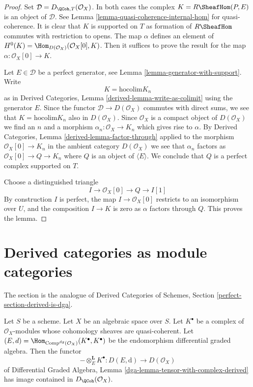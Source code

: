 \begin{proof}
Set $\mathcal{D} = D_{\QCoh, T}(\mathcal{O}_X)$. In both cases the complex
$K = R\SheafHom(P, E)$ is an object of $\mathcal{D}$. See
Lemma \ref{lemma-quasi-coherence-internal-hom} for quasi-coherence.
It is clear that $K$ is supported on $T$ as formation of $R\SheafHom$
commutes with restriction to opens.
The map $\alpha$ defines an element of
$H^0(K) = \Hom_{D(\mathcal{O}_X)}(\mathcal{O}_X[0], K)$.
Then it suffices to prove the result for the map
$\alpha : \mathcal{O}_X[0] \to K$.

\medskip\noindent
Let $E \in \mathcal{D}$ be a perfect generator, see
Lemma \ref{lemma-generator-with-support}. Write
$$
K = \text{hocolim} K_n
$$
as in Derived Categories, Lemma \ref{derived-lemma-write-as-colimit}
using the generator $E$. Since the functor $\mathcal{D} \to D(\mathcal{O}_X)$
commutes with direct sums, we see that $K = \text{hocolim} K_n$
also in $D(\mathcal{O}_X)$. Since $\mathcal{O}_X$ is a compact
object of $D(\mathcal{O}_X)$ we find an $n$ and a morphism
$\alpha_n : \mathcal{O}_X \to K_n$ which gives rise to $\alpha$.
By Derived Categories, Lemma \ref{derived-lemma-factor-through}
applied to the morphism $\mathcal{O}_X[0] \to K_n$ in the ambient
category $D(\mathcal{O}_X)$ we see that $\alpha_n$ factors as
$\mathcal{O}_X[0] \to Q \to K_n$ where $Q$ is an object
of $\langle E \rangle$. We conclude that $Q$ is a perfect complex
supported on $T$.

\medskip\noindent
Choose a distinguished triangle
$$
I \to \mathcal{O}_X[0] \to Q \to I[1]
$$
By construction $I$ is perfect, the map $I \to \mathcal{O}_X[0]$
restricts to an isomorphism over $U$, and the composition
$I \to K$ is zero as $\alpha$ factors through $Q$.
This proves the lemma.
\end{proof}










\section{Derived categories as module categories}
\label{section-derived-is-dga}

\noindent
The section is the analogue of
Derived Categories of Schemes, Section \ref{perfect-section-derived-is-dga}.

\begin{lemma}
\label{lemma-tensor-with-QCoh-complex}
Let $S$ be a scheme. Let $X$ be an algebraic space over $S$. Let $K^\bullet$
be a complex of $\mathcal{O}_X$-modules whose cohomology sheaves are
quasi-coherent. Let
$(E, d) = \Hom_{\text{Comp}^{dg}(\mathcal{O}_X)}(K^\bullet, K^\bullet)$
be the endomorphism differential graded algebra. Then the functor
$$
- \otimes_E^\mathbf{L} K^\bullet :
D(E, \text{d}) \longrightarrow D(\mathcal{O}_X)
$$
of
Differential Graded Algebra, Lemma
\ref{dga-lemma-tensor-with-complex-derived}
has image contained in $D_\QCoh(\mathcal{O}_X)$.
\end{lemma}

